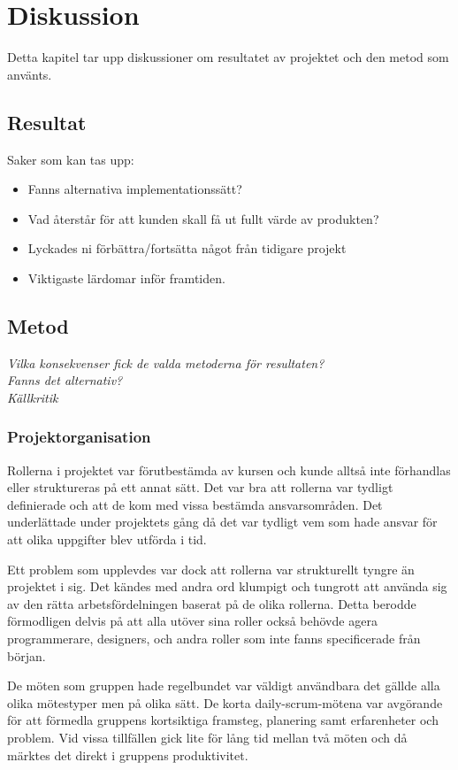 \chapter{Diskussion}
Detta kapitel tar upp diskussioner om resultatet av projektet och den metod som använts.
\section{Resultat}
Saker som kan tas upp:
\begin{itemize}
\item Fanns alternativa implementationssätt?
\item Vad återstår för att kunden skall få ut fullt värde av produkten?
\item Lyckades ni förbättra/fortsätta något från tidigare projekt
\item Viktigaste lärdomar inför framtiden.
\end{itemize}

\section{Metod}
\emph{Vilka konsekvenser fick de valda metoderna för resultaten?} \\
\emph{Fanns det alternativ?}\\
\emph{Källkritik}\\

\subsection{Projektorganisation}
Rollerna i projektet var förutbestämda av kursen och kunde alltså inte förhandlas eller struktureras på ett annat sätt. Det var bra att rollerna var tydligt definierade och att de kom med vissa bestämda ansvarsområden. Det underlättade under projektets gång då det var tydligt vem som hade ansvar för att olika uppgifter blev utförda i tid.

Ett problem som upplevdes var dock att rollerna var strukturellt tyngre än projektet i sig. Det kändes med andra ord klumpigt och tungrott att använda sig av den rätta arbetsfördelningen baserat på de olika rollerna. Detta berodde förmodligen delvis på att alla utöver sina roller också behövde agera programmerare, designers, och andra roller som inte fanns specificerade från början.  

De möten som gruppen hade regelbundet var väldigt användbara det gällde alla olika mötestyper men på olika sätt. De korta daily-scrum-mötena var avgörande för att förmedla gruppens kortsiktiga framsteg, planering samt erfarenheter och problem. Vid vissa tillfällen gick lite för lång tid mellan två möten och då märktes det direkt i gruppens produktivitet.

